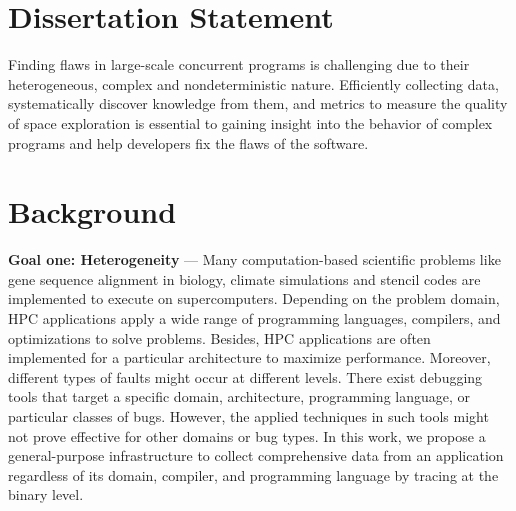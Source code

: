 \section{Dissertation Statement}
Finding flaws in large-scale concurrent programs is challenging due to their heterogeneous, complex and nondeterministic nature. Efficiently collecting data, systematically discover knowledge from them, and metrics to measure the quality of space exploration is essential to gaining insight into the behavior of complex programs and help developers fix the flaws of the software.

\section{Background}
\par{ \textbf{Goal one: Heterogeneity} ---
Many computation-based scientific problems like gene sequence alignment in biology, climate simulations and stencil codes are implemented to execute on supercomputers.
%
Depending on the problem domain, HPC applications apply a wide range of programming languages, compilers, and optimizations to solve problems.
%
Besides, HPC applications are often implemented for a particular architecture to maximize performance.
%
Moreover, different types of faults might occur at different levels.
%
There exist debugging tools that target a specific domain, architecture, programming language, or particular classes of bugs.
%
However, the applied techniques in such tools might not prove effective for other domains or bug types.
%
In this work, we propose a general-purpose infrastructure to collect comprehensive data from an application regardless of its domain, compiler, and programming language by tracing at the binary level.
%
}

